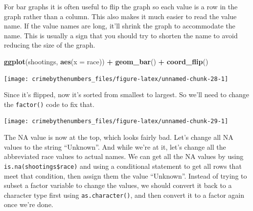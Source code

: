 \documentclass[
  12pt,
]{book}
\newenvironment{Shaded}{\begin{snugshade}}{\end{snugshade}}
\newcommand{\DataTypeTok}[1]{\textcolor[rgb]{0.27,0.27,0.27}{#1}}
\newcommand{\KeywordTok}[1]{\textcolor[rgb]{0.27,0.27,0.27}{\textbf{#1}}}
\newcommand{\NormalTok}[1]{#1}
\newcommand{\OperatorTok}[1]{\textcolor[rgb]{0.43,0.43,0.43}{\textbf{#1}}}
\newcommand{\OtherTok}[1]{\textcolor[rgb]{0.37,0.37,0.37}{#1}}
\newcommand{\StringTok}[1]{\textcolor[rgb]{0.5,0.5,0.5}{#1}}
\begin{document}
For bar graphs it is often useful to flip the graph so each value is a row in the graph rather than a column. This also makes it much easier to read the value name. If the value names are long, it'll shrink the graph to accommodate the name. This is usually a sign that you should try to shorten the name to avoid reducing the size of the graph.

\begin{Shaded}
\begin{Highlighting}[]
\KeywordTok{ggplot}\NormalTok{(shootings, }\KeywordTok{aes}\NormalTok{(}\DataTypeTok{x =}\NormalTok{ race)) }\OperatorTok{+}\StringTok{ }
\StringTok{  }\KeywordTok{geom\_bar}\NormalTok{() }\OperatorTok{+}
\StringTok{  }\KeywordTok{coord\_flip}\NormalTok{() }
\end{Highlighting}
\end{Shaded}

\begin{center}\texttt{[image: crimebythenumbers\_files/figure-latex/unnamed-chunk-28-1]} \end{center}

Since it's flipped, now it's sorted from smallest to largest. So we'll need to change the \texttt{factor()} code to fix that.

\begin{Shaded}
\end{Shaded}

\begin{center}\texttt{[image: crimebythenumbers\_files/figure-latex/unnamed-chunk-29-1]} \end{center}

The NA value is now at the top, which looks fairly bad. Let's change all NA values to the string ``Unknown''. And while we're at it, let's change all the abbreviated race values to actual names. We can get all the NA values by using \texttt{is.na(shootings\$race)} and using a conditional statement to get all rows that meet that condition, then assign them the value ``Unknown''. Instead of trying to subset a factor variable to change the values, we should convert it back to a character type first using \texttt{as.character()}, and then convert it to a factor again once we're done.
\end{document}
